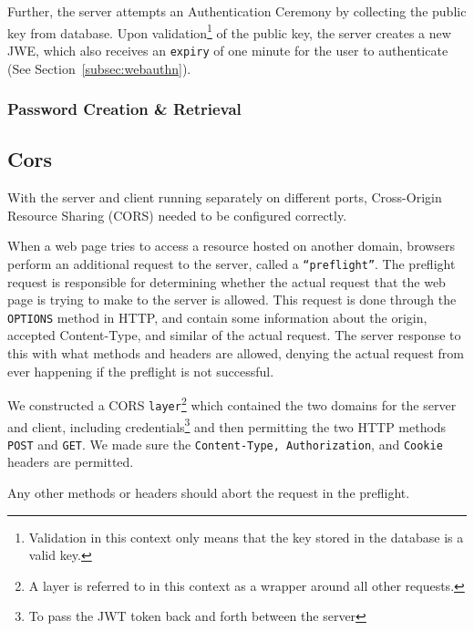 Further, the server attempts an Authentication Ceremony by collecting the
public key from database.
Upon validation\footnote{
  Validation in this context only means that the key stored in the database
  is a valid key.
} of the public key, the server creates a new JWE, which also receives an
\texttt{expiry} of one minute for the user to authenticate (See
Section~\ref{subsec:webauthn}).



\subsubsection{Password Creation \& Retrieval}

\subsection{Cors}\label{subsec:cors}
With the server and client running separately on different ports, Cross-Origin
Resource Sharing (CORS) needed to be configured correctly.

When a web page tries to access a resource hosted on another domain, browsers
perform an additional request to the server, called a \texttt{``preflight''}.
The preflight request is responsible for determining whether the actual
request that the web page is trying to make to the server is allowed.
This request is done through the \texttt{OPTIONS} method in HTTP, and contain
some information about the origin, accepted Content-Type, and similar of the
actual request.
The server response to this with what methods and headers are allowed,
denying the actual request from ever happening if the preflight is not
successful.

We constructed a CORS \texttt{layer}\footnote{
  A layer is referred to in this context as a wrapper around all other requests.
} which contained the two domains for the server and client, including
credentials\footnote{
  To pass the JWT token back and forth between the server
} and then permitting the two HTTP methods \texttt{POST} and \texttt{GET}.
We made sure the \texttt{Content-Type, Authorization}, and \texttt{Cookie}
headers are permitted.

Any other methods or headers should abort the request in the preflight.

